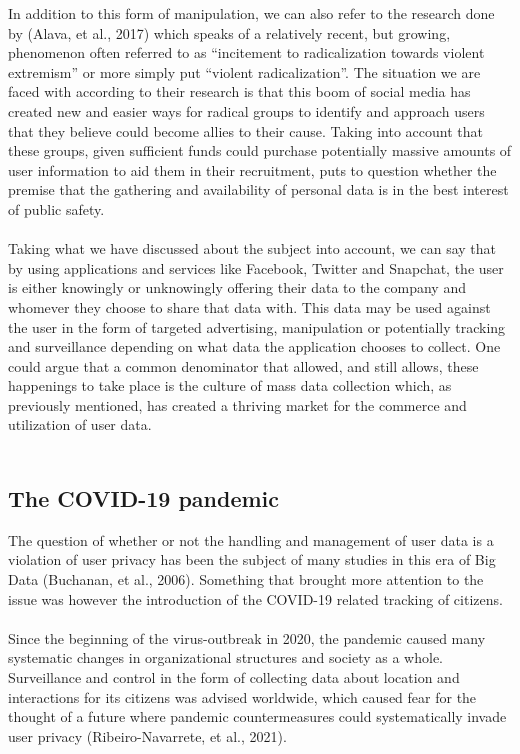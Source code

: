 \documentclass[11pt]{article}
\begin{document}
 

In addition to this form of manipulation, we can also refer to the research done by (Alava, et al., 2017) which speaks of a relatively recent, but growing, phenomenon often referred to as “incitement to radicalization towards violent extremism” or more simply put “violent radicalization”. The situation we are faced with according to their research is that this boom of social media has created new and easier ways for radical groups to identify and approach users that they believe could become allies to their cause. Taking into account that these groups, given sufficient funds could purchase potentially massive amounts of user information to aid them in their recruitment, puts to question whether the premise that the gathering and availability of personal data is in the best interest of public safety. \\ \\

 

Taking what we have discussed about the subject into account, we can say that by using applications and services like Facebook, Twitter and Snapchat, the user is either knowingly or unknowingly offering their data to the company and whomever they choose to share that data with. This data may be used against the user in the form of targeted advertising, manipulation or potentially tracking and surveillance depending on what data the application chooses to collect. One could argue that a common denominator that allowed, and still allows, these happenings to take place is the culture of mass data collection which, as previously mentioned, has created a thriving market for the commerce and utilization of user data.  \\ \\

\subsection{The COVID-19 pandemic}
The question of whether or not the handling and management of user data is a violation of user privacy has been the subject of many studies in this era of Big Data (Buchanan, et al., 2006). Something that brought more attention to the issue was however the introduction of the COVID-19 related tracking of citizens. \\ \\

Since the beginning of the virus-outbreak in 2020, the pandemic caused many systematic changes in organizational structures and society as a whole. Surveillance and control in the form of collecting data about location and interactions for its citizens was advised worldwide, which caused fear for the thought of a future where pandemic countermeasures could systematically invade user privacy (Ribeiro-Navarrete, et al., 2021).  \\ \\
\end{document}
